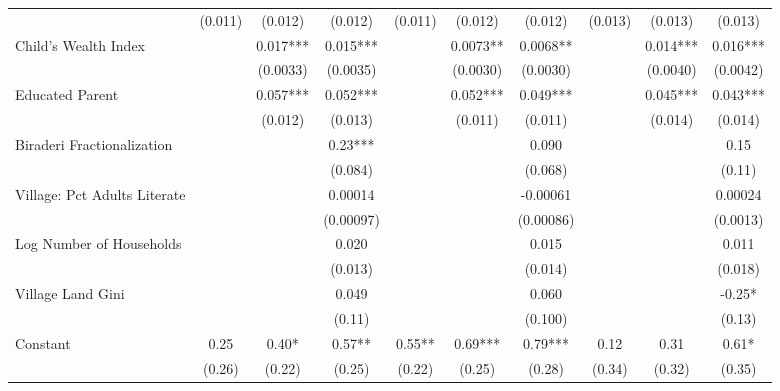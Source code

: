 \begin{sidewaystable}[htbp]
\begin{tabular}{l*{9}{c}}
                &  (0.011)   &  (0.012)   &  (0.012)   &  (0.011)   &  (0.012)   &  (0.012)   &  (0.013)   &  (0.013)   &  (0.013)   \\
Child's Wealth Index&            &    0.017***&    0.015***&            &   0.0073** &   0.0068** &            &    0.014***&    0.016***\\
                &            & (0.0033)   & (0.0035)   &            & (0.0030)   & (0.0030)   &            & (0.0040)   & (0.0042)   \\
Educated Parent &            &    0.057***&    0.052***&            &    0.052***&    0.049***&            &    0.045***&    0.043***\\
                &            &  (0.012)   &  (0.013)   &            &  (0.011)   &  (0.011)   &            &  (0.014)   &  (0.014)   \\
Biraderi Fractionalization&            &            &     0.23***&            &            &    0.090   &            &            &     0.15   \\
                &            &            &  (0.084)   &            &            &  (0.068)   &            &            &   (0.11)   \\
Village: Pct Adults Literate&            &            &  0.00014   &            &            & -0.00061   &            &            &  0.00024   \\
                &            &            &(0.00097)   &            &            &(0.00086)   &            &            & (0.0013)   \\
Log Number of Households&            &            &    0.020   &            &            &    0.015   &            &            &    0.011   \\
                &            &            &  (0.013)   &            &            &  (0.014)   &            &            &  (0.018)   \\
Village Land Gini&            &            &    0.049   &            &            &    0.060   &            &            &    -0.25*  \\
                &            &            &   (0.11)   &            &            &  (0.100)   &            &            &   (0.13)   \\
Constant        &     0.25   &     0.40*  &     0.57** &     0.55** &     0.69***&     0.79***&     0.12   &     0.31   &     0.61*  \\
                &   (0.26)   &   (0.22)   &   (0.25)   &   (0.22)   &   (0.25)   &   (0.28)   &   (0.34)   &   (0.32)   &   (0.35)   \\

\end{tabular}
\end{sidewaystable}
